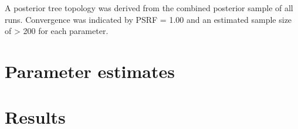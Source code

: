 \documentclass[openany]{book}
\theoremstyle{definition}
\theoremstyle{definition}
\theoremstyle{definition}
\theoremstyle{remark}
\begin{document}
A posterior tree topology was derived from the combined posterior sample
of all runs. Convergence was indicated by PSRF = 1.00 and an estimated
sample size of \textgreater{} 200 for each parameter.

\section{Parameter estimates}\label{parameter-estimates}

\section{Results}\label{results-2}


\end{document}
